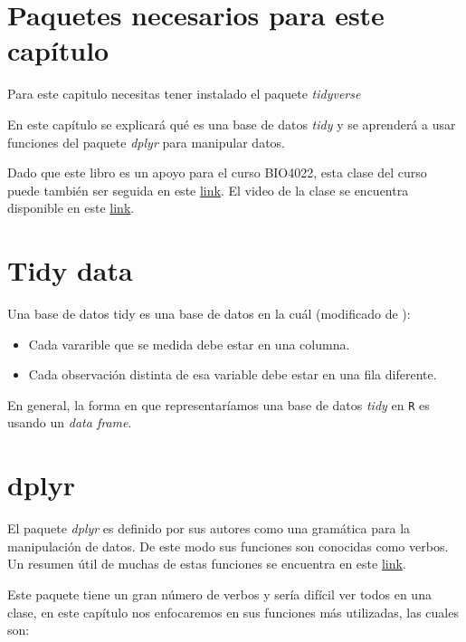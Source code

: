 \documentclass[]{book}
\providecommand{\tightlist}{%
  \setlength{\itemsep}{0pt}\setlength{\parskip}{0pt}}
\begin{document}
\hypertarget{paquetes-necesarios-para-este-capitulo}{%
\section{Paquetes necesarios para este
capítulo}\label{paquetes-necesarios-para-este-capitulo}}

Para este capitulo necesitas tener instalado el paquete \emph{tidyverse}

En este capítulo se explicará qué es una base de datos \emph{tidy}
\citep{wickham2014tidy} y se aprenderá a usar funciones del paquete
\emph{dplyr} \citep{R-dplyr} para manipular datos.

Dado que este libro es un apoyo para el curso BIO4022, esta clase del
curso puede también ser seguida en este
\href{https://derek-corcoran-barrios.github.io/Clase1/Clase1TidyData}{link}.
El video de la clase se encuentra disponible en este
\href{https://youtu.be/vQKWd02HB90}{link}.

\hypertarget{tidy-data}{%
\section{Tidy data}\label{tidy-data}}

Una base de datos tidy es una base de datos en la cuál (modificado de
\citep{leek2015elements}):

\begin{itemize}
\tightlist
\item
  Cada vararible que se medida debe estar en una columna.
\item
  Cada observación distinta de esa variable debe estar en una fila
  diferente.
\end{itemize}

En general, la forma en que representaríamos una base de datos
\emph{tidy} en \texttt{R} es usando un \emph{data frame}.

\hypertarget{dplyr}{%
\section{dplyr}\label{dplyr}}

El paquete \emph{dplyr} es definido por sus autores como una gramática
para la manipulación de datos. De este modo sus funciones son conocidas
como verbos. Un resumen útil de muchas de estas funciones se encuentra
en este
\href{https://www.rstudio.com/wp-content/uploads/2015/02/data-wrangling-cheatsheet.pdf}{link}.

Este paquete tiene un gran número de verbos y sería difícil ver todos en
una clase, en este capítulo nos enfocaremos en sus funciones más
utilizadas, las cuales son:
\end{document}
